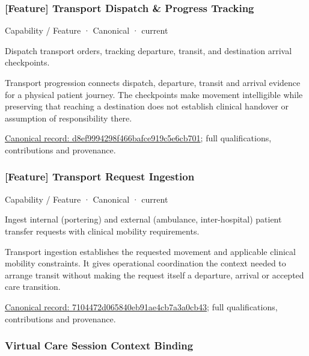 \subsubsection{[Feature] Transport Dispatch \& Progress Tracking}

\label{element:d8ef9994298f466bafce919c5e6cb701}
{\small Capability / Feature · Canonical · current}\par

Dispatch transport orders, tracking departure, transit, and destination arrival checkpoints.



Transport progression connects dispatch, departure, transit and arrival evidence for a physical patient journey. The checkpoints make movement intelligible while preserving that reaching a destination does not establish clinical handover or assumption of responsibility there.


{\footnotesize \href{../../../../continuum/strategy/capability/feature/d8ef9994298f466bafce919c5e6cb701.md}{Canonical record: d8ef9994298f466bafce919c5e6cb701}; full qualifications, contributions and provenance.}\par
\subsubsection{[Feature] Transport Request Ingestion}

\label{element:7104472d065840eb91ae4cb7a3a0cb43}
{\small Capability / Feature · Canonical · current}\par

Ingest internal (portering) and external (ambulance, inter-hospital) patient transfer requests with clinical mobility requirements.



Transport ingestion establishes the requested movement and applicable clinical mobility constraints. It gives operational coordination the context needed to arrange transit without making the request itself a departure, arrival or accepted care transition.


{\footnotesize \href{../../../../continuum/strategy/capability/feature/7104472d065840eb91ae4cb7a3a0cb43.md}{Canonical record: 7104472d065840eb91ae4cb7a3a0cb43}; full qualifications, contributions and provenance.}\par
\subsubsection{Virtual Care Session Context Binding}

